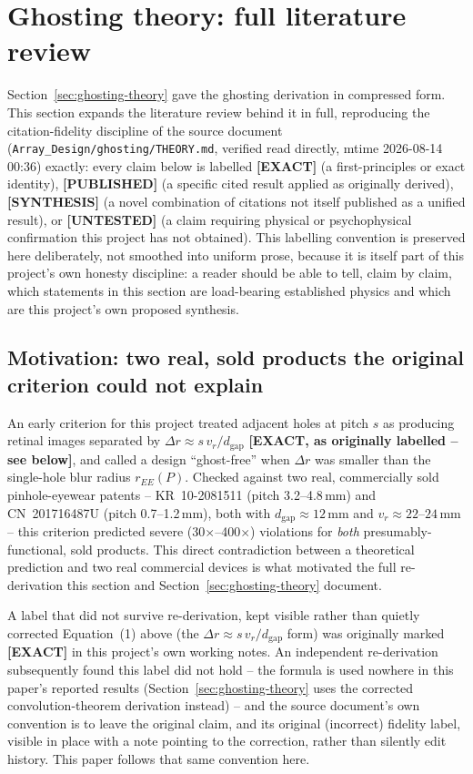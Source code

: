 \section{Ghosting theory: full literature review}
\label{sec:ghosting-lit-review}
Section~\ref{sec:ghosting-theory} gave the ghosting derivation in compressed form. This
section expands the literature review behind it in full, reproducing the
citation-fidelity discipline of the source document
(\texttt{Array\_Design/ghosting/THEORY.md}, verified read directly, mtime 2026-08-14
00:36) exactly: every claim below is labelled \textbf{[EXACT]} (a first-principles or
exact identity), \textbf{[PUBLISHED]} (a specific cited result applied as originally
derived), \textbf{[SYNTHESIS]} (a novel combination of citations not itself published as
a unified result), or \textbf{[UNTESTED]} (a claim requiring physical or psychophysical
confirmation this project has not obtained). This labelling convention is preserved
here deliberately, not smoothed into uniform prose, because it is itself part of this
project's own honesty discipline: a reader should be able to tell, claim by claim,
which statements in this section are load-bearing established physics and which are
this project's own proposed synthesis.

\subsection{Motivation: two real, sold products the original criterion could not explain}
An early criterion for this project treated adjacent holes at pitch $s$ as producing
retinal images separated by $\Delta r\approx s\,v_r/d_{\mathrm{gap}}$
\textbf{[EXACT, as originally labelled -- see below]}, and called a design ``ghost-free''
when $\Delta r$ was smaller than the single-hole blur radius $r_{EE}(P)$. Checked
against two real, commercially sold pinhole-eyewear patents -- KR~10-2081511 (pitch
3.2--4.8\,mm) and CN~201716487U (pitch 0.7--1.2\,mm), both with
$d_{\mathrm{gap}}\approx12$\,mm and $v_r\approx22$--$24$\,mm -- this criterion predicted
severe (30$\times$--400$\times$) violations for \emph{both} presumably-functional, sold
products. This direct contradiction between a theoretical prediction and two real
commercial devices is what motivated the full re-derivation this section and
Section~\ref{sec:ghosting-theory} document.

\begin{warnbox}{A label that did not survive re-derivation, kept visible rather than quietly corrected}
Equation~(1) above (the $\Delta r\approx s\,v_r/d_{\mathrm{gap}}$ form) was originally
marked \textbf{[EXACT]} in this project's own working notes. An independent
re-derivation subsequently found this label did not hold -- the formula is used nowhere
in this paper's reported results (Section~\ref{sec:ghosting-theory} uses the corrected
convolution-theorem derivation instead) -- and the source document's own convention is
to leave the original claim, and its original (incorrect) fidelity label, visible in
place with a note pointing to the correction, rather than silently edit history. This
paper follows that same convention here.
\end{warnbox}

